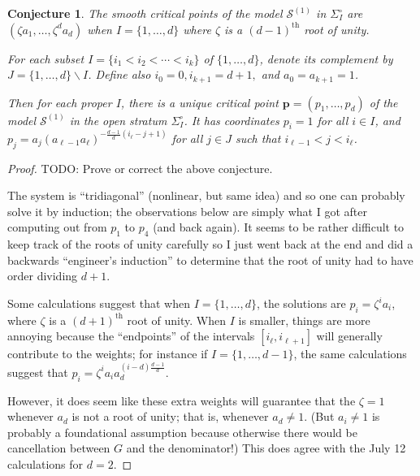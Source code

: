 \documentclass[A4,12pt]{article}
\newcommand{\<}{\left\langle}
\renewcommand{\>}{\right\rangle}
\newcommand{\steps}{\mathcal{S}}
\newtheorem{conjecture}[theorem]{Conjecture}
\theoremstyle{definition}
\theoremstyle{example}
\begin{document}
\begin{conjecture}
The smooth critical points of the model $\steps^{(1)}$ in $\Sigma_I^\circ$ are $(\zeta a_1,\dots, \zeta^da_d)$ when $I=\{1,\dots, d\}$ where $\zeta$ is a $(d-1)^\text{th}$ root of unity. 

For each subset $I=\{i_1<i_2<\cdots< i_k\}$ of $\{1,\dots, d\}$, denote its complement by $J=\{1,\dots, d\}\smallsetminus I$. Define also $i_0=0, i_{k+1}=d+1,$ and $a_0=a_{k+1}=1$.

Then for each proper $I$, there is a unique critical point $\mathbf{p}=(p_1,\dots, p_d)$ of the model $\steps^{(1)}$ in the open stratum $\Sigma_I^\circ$. It has coordinates $p_i=1$ for all $i\in I$, and $p_j = a_j (a_{\ell-1} a_\ell)^{-\frac{d-1}{d}(i_\ell-j+1)}$ for all $j\in J$ such that $i_{\ell-1} < j < i_\ell$. 
\end{conjecture}

\begin{proof}
TODO: Prove or correct the above conjecture.

The system is ``tridiagonal'' (nonlinear, but same idea) and so one can probably solve it by induction; the observations below are simply what I got after computing out from $p_1$ to $p_4$ (and back again). It seems to be rather difficult to keep track of the roots of unity carefully so I just went back at the end and did a backwards ``engineer's induction'' to determine that the root of unity had to have order dividing $d+1$.

Some calculations suggest that when $I=\{1,\dots,d\}$, the solutions are $p_i=\zeta^i a_i$, where $\zeta$ is a $(d+1)^\text{th}$ root of unity. When $I$ is smaller, things are more annoying because the ``endpoints'' of the intervals $[i_\ell,i_{\ell+1}]$ will generally contribute to the weights; for instance if $I=\{1,\dots, d-1\}$, the same calculations suggest that $p_i=\zeta^i a_i a_d^{(i-d)\frac{d-1}{d}}$. 

However, it does seem like these extra weights will guarantee that the $\zeta=1$ whenever $a_d$ is not a root of unity; that is, whenever $a_d\neq 1$. (But $a_i\neq 1$ is probably a foundational assumption because otherwise there would be cancellation between $G$ and the denominator!) This does agree with the July 12 calculations for $d=2$.
\end{proof}




\newpage
\footnotesize
\begin{thebibliography}{10}



%

\end{thebibliography}
\end{document}
